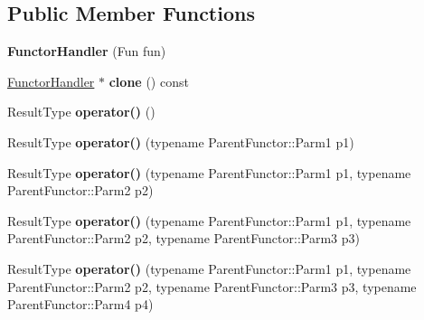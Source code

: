\subsection*{Public Member Functions}
\begin{DoxyCompactItemize}
\item 
\hypertarget{classutilspp_1_1FunctorHandler_a51626d2b3812b75b8c599b6af0b03248}{{\bfseries Functor\-Handler} (Fun fun)}\label{classutilspp_1_1FunctorHandler_a51626d2b3812b75b8c599b6af0b03248}

\item 
\hypertarget{classutilspp_1_1FunctorHandler_a656e2e439733ea62a323da708d40abca}{\hyperlink{classutilspp_1_1FunctorHandler}{Functor\-Handler} $\ast$ {\bfseries clone} () const }\label{classutilspp_1_1FunctorHandler_a656e2e439733ea62a323da708d40abca}

\item 
\hypertarget{classutilspp_1_1FunctorHandler_a0a33055a2db431cbe0db5e4d8476e074}{Result\-Type {\bfseries operator()} ()}\label{classutilspp_1_1FunctorHandler_a0a33055a2db431cbe0db5e4d8476e074}

\item 
\hypertarget{classutilspp_1_1FunctorHandler_a18844d204f2ed519cf5d7f1e303fabee}{Result\-Type {\bfseries operator()} (typename Parent\-Functor\-::\-Parm1 p1)}\label{classutilspp_1_1FunctorHandler_a18844d204f2ed519cf5d7f1e303fabee}

\item 
\hypertarget{classutilspp_1_1FunctorHandler_adb36146996463b68fd5c2b6a6b910624}{Result\-Type {\bfseries operator()} (typename Parent\-Functor\-::\-Parm1 p1, typename Parent\-Functor\-::\-Parm2 p2)}\label{classutilspp_1_1FunctorHandler_adb36146996463b68fd5c2b6a6b910624}

\item 
\hypertarget{classutilspp_1_1FunctorHandler_a425f53a4c5db48e9a96341e6020172e9}{Result\-Type {\bfseries operator()} (typename Parent\-Functor\-::\-Parm1 p1, typename Parent\-Functor\-::\-Parm2 p2, typename Parent\-Functor\-::\-Parm3 p3)}\label{classutilspp_1_1FunctorHandler_a425f53a4c5db48e9a96341e6020172e9}

\item 
\hypertarget{classutilspp_1_1FunctorHandler_af0d43ca57ea4938d67e23b69cd291b15}{Result\-Type {\bfseries operator()} (typename Parent\-Functor\-::\-Parm1 p1, typename Parent\-Functor\-::\-Parm2 p2, typename Parent\-Functor\-::\-Parm3 p3, typename Parent\-Functor\-::\-Parm4 p4)}\label{classutilspp_1_1FunctorHandler_af0d43ca57ea4938d67e23b69cd291b15}


\end{DoxyCompactItemize}

